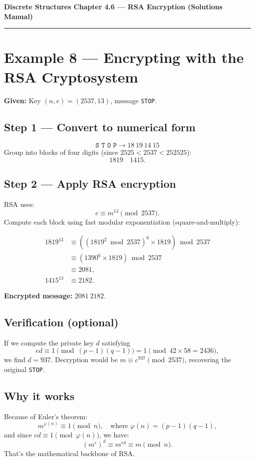 \documentclass[12pt]{article}
\begin{document}
{\large \textbf{Discrete Structures \quad Chapter 4.6 — RSA Encryption (Solutions Manual)}}

\hrule
\vspace{0.6em}

\section*{Example 8 — Encrypting with the RSA Cryptosystem}

\textbf{Given:} Key \((n, e) = (2537, 13)\), message \texttt{STOP}.

\subsection*{Step 1 — Convert to numerical form}
\[
\texttt{S T O P} \rightarrow 18\ 19\ 14\ 15
\]
Group into blocks of four digits (since \(2525 < 2537 < 252525\)):
\[
1819 \quad 1415.
\]

\subsection*{Step 2 — Apply RSA encryption}
RSA uses:
\[
c \equiv m^{13} \pmod{2537}.
\]
Compute each block using fast modular exponentiation (square-and-multiply):

\[
\begin{aligned}
1819^{13} &\equiv ((1819^2 \bmod 2537)^6 \times 1819) \bmod 2537 \\
&\equiv (1390^6 \times 1819) \bmod 2537 \\
&\equiv 2081, \\
1415^{13} &\equiv 2182.
\end{aligned}
\]

\textbf{Encrypted message:} \(\boxed{2081\ 2182}\).

\subsection*{Verification (optional)}
If we compute the private key \(d\) satisfying
\[
ed \equiv 1 \pmod{(p-1)(q-1)} = 1 \pmod{42\times58=2436},
\]
we find \(d = 937.\)
Decryption would be \(m \equiv c^{937} \pmod{2537}\), recovering the original \texttt{STOP}.

\subsection*{Why it works}
Because of Euler’s theorem:
\[
m^{\varphi(n)} \equiv 1 \pmod{n}, \quad \text{where } \varphi(n) = (p-1)(q-1),
\]
and since \(ed \equiv 1 \pmod{\varphi(n)}\), we have:
\[
(m^e)^d \equiv m^{ed} \equiv m \pmod{n}.
\]
That’s the mathematical backbone of RSA.
\end{document}
